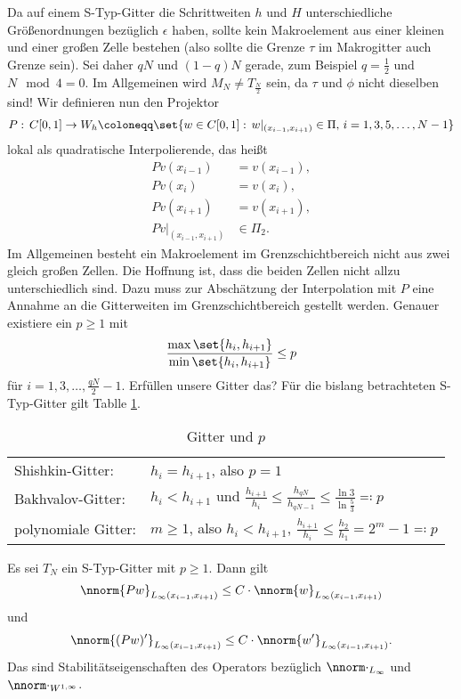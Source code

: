 Da auf einem S-Typ-Gitter die Schrittweiten $h$ und $H$ unterschiedliche Größenordnungen bezüglich $\epsilon$ haben, sollte kein Makroelement aus einer kleinen und einer großen Zelle bestehen (also sollte die Grenze $\tau$ im Makrogitter auch Grenze sein). Sei daher $qN$ und $(1-q)N$ gerade, zum Beispiel $q = \frac 12$ und $N \mod 4 = 0$. Im Allgemeinen wird $M_{N} \neq T_{\frac N 2}$ sein, da $\tau$ und $\phi$ nicht dieselben sind! Wir definieren nun den Projektor
\begin{align*}
  P: \, C[0, 1] \to W_{h} \coloneqq \set{w \in C[0, 1]: \, w|_{(x_{i-1}, x_{i+1})} \in \Pi, \, i = 1, 3, 5, \dots, N-1}
\end{align*}
lokal als quadratische Interpolierende, das heißt
\begin{align*}
  Pv(x_{i-1}) &= v(x_{i-1}),\\
  Pv(x_{i}) &= v(x_{i}),\\
  Pv(x_{i+1}) &= v(x_{i+1}),\\
  Pv|_{(x_{i-1}, x_{i+1})} &\in \Pi_{2}.
\end{align*}
Im Allgemeinen besteht ein Makroelement im Grenzschichtbereich nicht aus zwei gleich großen Zellen. Die Hoffnung ist, dass die beiden Zellen nicht allzu unterschiedlich sind. Dazu muss zur Abschätzung der Interpolation mit $P$ eine Annahme an die Gitterweiten im Grenzschichtbereich gestellt werden. Genauer existiere ein $p\geq 1$ mit
\begin{align*}
  \frac{\max \set{h_{i}, h_{i+1}}}{\min \set{h_{i}, h_{i+1}}}\leq p
\end{align*}
für $i = 1, 3, \dots, \frac {qN} 2 - 1$. Erfüllen unsere Gitter das? Für die bislang betrachteten S-Typ-Gitter gilt Tablle \ref{tab:gitter_u_h}. 
\begin{table}[h!]
  \centering
  \begin{tabular}[h!]{l l}
    Shishkin-Gitter: & $h_{i} = h_{i+1}$, also $p = 1$\\
    Bakhvalov-Gitter: & $h_{i} < h_{i+1}$ und $\frac{h_{i+1}}{h_{i}} \leq \frac{h_{qN}}{h_{qN-1}} \leq \frac{\ln 3}{\ln \frac 53} \eqqcolon p$\\
    polynomiale Gitter: & $m \geq 1$, also $h_{i}< h_{i+1}$, $\frac{h_{i+1}}{h_{i}} \leq \frac{h_{2}}{h_{1}} = 2^{m} -1 \eqqcolon p$
  \end{tabular}
  \caption{Gitter und $p$}
  \label{tab:gitter_u_h}
\end{table}
\begin{lemma}\label{lem:6-17}
  Es sei $T_{N}$ ein S-Typ-Gitter mit $p\geq 1$. Dann gilt
  \begin{align*}
    \nnorm{Pw}_{L_{\infty}(x_{i-1}, x_{i+1})} \leq C \cdot\nnorm{w}_{L_{\infty}(x_{i-1}, x_{i+1})}
  \end{align*}
  und
  \begin{align*}
    \nnorm{(Pw)'}_{L_{\infty}(x_{i-1}, x_{i+1})} \leq C \cdot\nnorm{w'}_{L_{\infty}(x_{i-1}, x_{i+1})}. 
  \end{align*}
  Das sind Stabilitätseigenschaften des Operators bezüglich $\nnorm \cdot_{L_{\infty}}$ und $\nnorm \cdot_{W^{1, \infty}}$.
\end{lemma}
